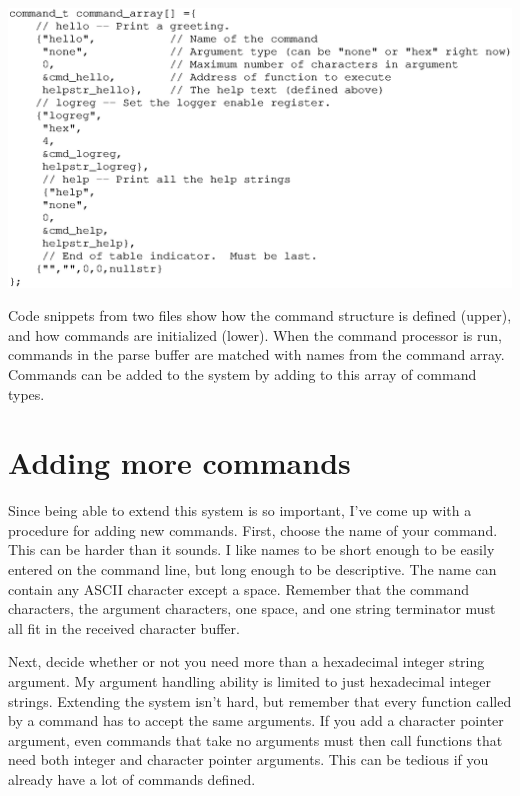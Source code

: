 \begin{listing}[ht]
    \begin{center}
        \includegraphics[clip,scale=0.75]{command_array}
        \caption{Code snippets from two files show how the command structure is defined (upper), and how commands are initialized (lower).  When the command processor is run, commands in the parse buffer are matched with names from the command array.  Commands can be added to the system by adding to this array of command types.\label{lst:cmdarray}}
    \end{center}
\end{listing}

\clearpage{}
\section{Adding more commands}
Since being able to extend this system is so important, I've come up with a procedure for adding new commands.  First, choose the name of your command.  This can be harder than it sounds.  I like names to be short enough to be easily entered on the command line, but long enough to be descriptive.  The name can contain any ASCII character except a space.  Remember that the command characters, the argument characters, one space, and one string terminator must all fit in the received character buffer.
    
Next, decide whether or not you need more than a hexadecimal integer string argument.  My argument handling ability is limited to just hexadecimal integer strings.  Extending the system isn't hard, but remember that every function called by a command has to accept the same arguments.  If you add a character pointer argument, even commands that take no arguments must then call functions that need both integer and character pointer arguments.  This can be tedious if you already have a lot of commands defined.

